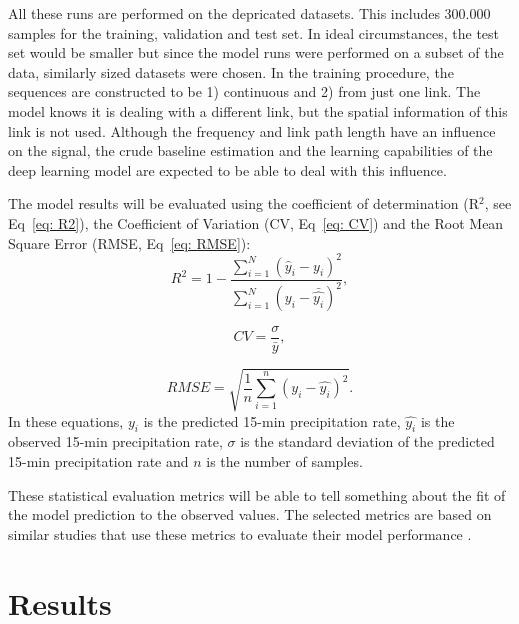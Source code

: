\documentclass[twocolumn, 10pt, a4paper]{memoir}
\begin{document}
	All these runs are performed on the depricated datasets. This includes 300.000 samples for the training, validation and test set. In ideal circumstances, the test set would be smaller but since the model runs were performed on a subset of the data, similarly sized datasets were chosen. In the training procedure, the sequences are constructed to be 1) continuous and 2) from just one link. The model knows it is dealing with a different link, but the spatial information of this link is not used. Although the frequency and link path length have an influence on the signal, the crude baseline estimation and the learning capabilities of the deep learning model are expected to be able to deal with this influence. 

	The model results will be evaluated using the coefficient of determination (R$^{2}$, see Eq~\ref{eq: R2}), the Coefficient of Variation (CV, Eq~\ref{eq: CV}) and the Root Mean Square Error (RMSE, Eq~\ref{eq: RMSE}):
	\begin{equation} \label{eq: R2}
		R^2 = 1- \frac{\sum_{i=1}^{N} (\hat{y}_i - y_i)^2}{\sum_{i=1}^{N} (y_i - \bar{\hat{y_i}})^2},
	\end{equation}

	\begin{equation} \label{eq: CV}
		CV = \frac{\sigma}{\bar{y}},
	\end{equation}

	\begin{equation} \label{eq: RMSE}
		RMSE = \sqrt{\frac{1}{n} \sum_{i=1}^{n} (y_i - \hat{y_i})^2}.
	\end{equation}
	In these equations, $y_i$ is the predicted 15-min precipitation rate, $\hat{y_i}$ is the observed 15-min precipitation rate, $\sigma$ is the standard deviation of the predicted 15-min precipitation rate and $n$ is the number of samples.
	
	These statistical evaluation metrics will be able to tell something about the fit of the model prediction to the observed values. The selected metrics are based on similar studies that use these metrics to evaluate their model performance .
	
	
	\chapter{Results} \label{ch: results}
\end{document}
